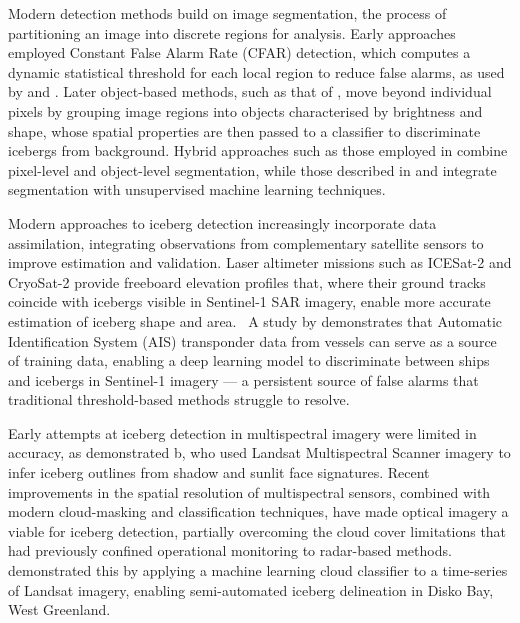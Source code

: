 \documentclass[11pt, letterpaper]{article}
\begin{document}
Modern detection methods build on image segmentation, the process of partitioning an image into discrete regions for analysis. Early approaches employed Constant False Alarm Rate (CFAR) detection, which computes a dynamic statistical threshold for each local region to reduce false alarms, as used by \textcite{power_etal_2001} and \textcite{gill_2001}. Later object-based methods, such as that of \textcite{mazur_amundsen_2017}, move beyond individual pixels by grouping image regions into objects characterised by brightness and shape, whose spatial properties are then passed to a classifier to discriminate icebergs from background. Hybrid approaches such as those employed in \textcite{karvonen_etal_2021} combine pixel-level and object-level segmentation, while those described in \textcite{barbat_etal_2021} and \textcite{braakmann_folgmann_etal_2023} integrate segmentation with 
unsupervised machine learning techniques.

Modern approaches to iceberg detection increasingly incorporate data assimilation, integrating observations from complementary satellite sensors to improve estimation and validation. Laser altimeter missions such as ICESat-2 and CryoSat-2 provide freeboard elevation profiles that, where their ground tracks coincide with icebergs visible in Sentinel-1 SAR imagery, enable more accurate estimation of iceberg shape and area.~\parencite{koo2021, otosaka2023} A study by \textcite{heiselberg_etal_2022} 
demonstrates that Automatic Identification System (AIS) transponder data 
from vessels can serve as a source of training data, 
enabling a deep learning model to discriminate between ships and icebergs 
in Sentinel-1 imagery --- a persistent source of false alarms that 
traditional threshold-based methods struggle to resolve.

Early attempts at iceberg detection in multispectral imagery were limited in accuracy, 
as demonstrated b, \textcite{williams_macdonald_1995} who used Landsat 
Multispectral Scanner imagery to infer iceberg outlines from shadow and 
sunlit face signatures. Recent improvements in the spatial resolution of 
multispectral sensors, combined with modern cloud-masking and classification 
techniques, have made optical imagery a viable for iceberg 
detection, partially overcoming the cloud cover limitations that had previously 
confined operational monitoring to radar-based methods. \textcite{scheick_etal_2019} 
demonstrated this by applying a machine learning cloud classifier to a 
time-series of Landsat imagery, enabling semi-automated iceberg delineation 
in Disko Bay, West Greenland.
\end{document}
